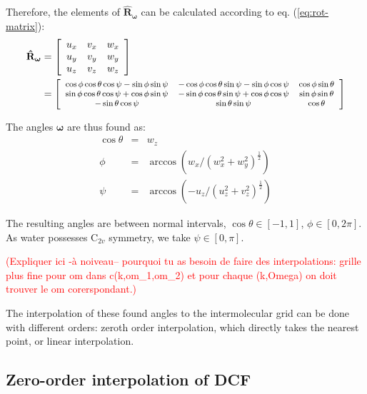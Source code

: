 Therefore, the elements of $\mathbf{\hat{R}}_{\boldsymbol{\omega}}$
can be calculated according to eq. (\ref{eq:rot-matrix}):
\begin{align}
\mathbf{\hat{R}}_{\boldsymbol{\omega}} & =\left[\begin{array}{ccc}
u_{x} & v_{x} & w_{x}\\
u_{y} & v_{y} & w_{y}\\
u_{z} & v_{z} & w_{z}
\end{array}\right]\\
 & =\footnotesize\left[\begin{array}{ccc}
\cos\phi\cos\theta\cos\psi-\sin\phi\sin\psi & -\cos\phi\cos\theta\sin\psi-\sin\phi\cos\psi & \cos\phi\sin\theta\\
\sin\phi\cos\theta\cos\psi+\cos\phi\sin\psi & -\sin\phi\cos\theta\sin\psi+\cos\phi\cos\psi & \sin\phi\sin\theta\\
-\sin\theta\cos\psi & \sin\theta\sin\psi & \cos\theta
\end{array}\right]\nonumber 
\end{align}

The angles $\boldsymbol{\omega}$ are thus found as:
\begin{eqnarray}
\cos\theta & = & w_{z}\nonumber \\
\phi & = & \arccos(w_{x}/(w_{x}^{2}+w_{y}^{2})^{\frac{1}{2}})\label{eq:omega}\\
\psi & = & \arccos(-u_{z}/(u_{z}^{2}+v_{z}^{2})^{\frac{1}{2}})\nonumber 
\end{eqnarray}

The resulting angles are between normal intervals, $\cos\theta\in\left[-1,1\right]$,
$\phi\in\left[0,2\pi\right]$. As water possesses $\mathrm{C}_{2v}$
symmetry, we take $\psi\in\left[0,\pi\right]$. 

\textcolor{red}{(Expliquer ici -à noiveau– pourquoi tu as besoin de
faire des interpolations: grille plus fine pour om dans c(k,om\_1,om\_2)
et pour chaque (k,Omega) on doit trouver le om corerspondant.)}

The interpolation of these found angles to the intermolecular grid
can be done with different orders: zeroth order interpolation, which
directly takes the nearest point, or linear interpolation.

\subsection{Zero-order interpolation of DCF\label{subsec:Zero-order-interpolation-of}}

